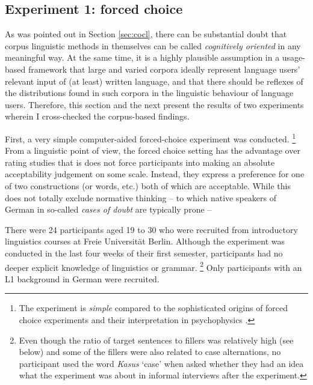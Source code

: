 \documentclass[USenglish]{article}
\begin{document}
\subsection{Experiment 1: forced choice}

%

As was pointed out in Section \ref{sec:cocl}, there can be substantial doubt that corpus linguistic methods in themselves can be called \textit{cognitively oriented} in any meaningful way.
At the same time, it is a highly plausible assumption in a usage-based framework that large and varied corpora ideally represent language users' relevant input of (at least) written language, and that there should be reflexes of the distributions found in such corpora in the linguistic behaviour of language users.
Therefore, this section and the next present the results of two experiments wherein I cross-checked the corpus-based findings.

First, a very simple computer-aided forced-choice experiment was conducted.%
\footnote{The experiment is \textit{simple} compared to the sophisticated origins of forced choice experiments and their interpretation in psychophysics \citep[166--179]{MacmillanCreelman2005}.}
From a linguistic point of view, the forced choice setting has the advantage over rating studies that is does not force participants into making an absolute acceptability judgement on some scale.
Instead, they express a preference for one of two constructions (or words, etc.) both of which are acceptable.
While this does not totally exclude normative thinking -- to which native speakers of German in so-called \textit{cases of doubt} are typically prone -- 

There were 24 participants aged 19 to 30 who were recruited from introductory linguistics courses at Freie Universität Berlin.
Although the experiment was conducted in the last four weeks of their first semester, participants had no deeper explicit knowledge of linguistics or grammar.%
\footnote{Even though the ratio of target sentences to fillers was relatively high (see below) and some of the fillers were also related to case alternations, no participant used the word \textit{Kasus} `case' when asked whether they had an idea what the experiment was about in informal interviews after the experiment.}
Only participants with an L1 background in German were recruited.
\end{document}
